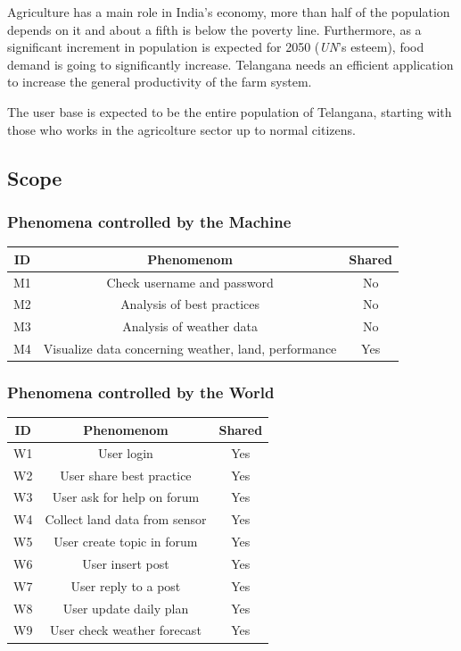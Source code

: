 \documentclass[table, 12pt]{article}
\begin{document}
Agriculture has a main role in India's economy, more than half of the population depends on it and about a fifth is below the poverty line.
Furthermore, as a significant increment in population is expected for 2050 (\emph{UN}'s esteem), food demand is going to significantly increase.
Telangana needs an efficient application to increase the general productivity of the farm system.

The user base is expected to be the entire population of Telangana, starting with those who works in the agricolture sector up to normal citizens.

\subsection{Scope} %
\subsubsection*{Phenomena controlled by the Machine}
\begin{tabular}{|c|c|c|}
    \hline
    \textbf{ID} & \textbf{Phenomenom} & \textbf{Shared} \\\hline\hline
    M1 & Check username and password & No \\\hline
    M2 & Analysis of best practices & No\\\hline
    M3 & Analysis of weather data & No \\\hline
    M4 & Visualize data concerning weather, land, performance & Yes\\\hline
    \hline
\end{tabular}

\subsubsection*{Phenomena controlled by the World}
\begin{center}
    \begin{tabular}{|c|c|c|}
        \hline
        \textbf{ID} & \textbf{Phenomenom} & \textbf{Shared} \\\hline\hline
        W1 & User login & Yes\\\hline
        W2 & User share best practice & Yes\\\hline
        W3 & User ask for help on forum & Yes\\\hline
        W4 & Collect land data from sensor & Yes\\\hline
        W5 & User create topic in forum & Yes\\\hline 
        W6 & User insert post & Yes\\\hline
        W7 & User reply to a post & Yes \\\hline
        W8 & User update daily plan & Yes\\\hline
        W9 & User check weather forecast & Yes\\\hline
        \hline
    \end{tabular}
\end{center}
\end{document}
